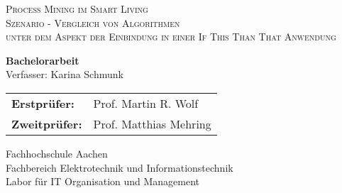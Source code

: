 \begin{titlepage}
\begin{center}
\hfill
\newcommand{\HorizontalLine}{\rule{\linewidth}{0.3mm}}
\begin{spacing}{2.5}
    \textsc{\Large  Process Mining im Smart Living} \\
    \textsc{\Large  Szenario - Vergleich von Algorithmen} \\
    \textsc{\Large   unter dem Aspekt der Einbindung in einer If This Than That Anwendung}\\
\end{spacing}
\vspace{20mm}

{\Large \bfseries Bachelorarbeit}\\[1.1cm]
{\Large Verfasser: Karina Schmunk} \\[1.2cm]

\begin{tabular}[hc]{>{\large}l >{\large}l}
  \bfseries Erstprüfer: & Prof. Martin R. Wolf \\[0.3cm]
  \bfseries Zweitprüfer: & Prof. Matthias Mehring \\[1.2cm]
\end{tabular}
\vfill  %

\Large {
    Fachhochschule Aachen\\
    Fachbereich Elektrotechnik und Informationstechnik\\
    Labor für IT Organisation und Management\\[1cm]

    
}
\end{center}
\end{titlepage}

